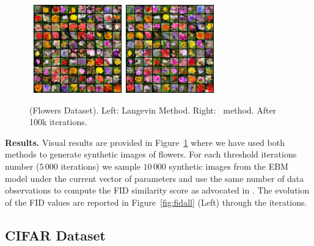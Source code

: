 \documentclass[10pt,twocolumn,letterpaper]{article}
\begin{document}
\begin{figure}[t]
\begin{center}
        \mbox{
        \includegraphics[width=1.5in]{figs/flowerslangevin}
        \includegraphics[width=1.5in]{figs/flowersanila}
        }
\end{center}
	\caption{(Flowers Dataset). Left: Langevin Method. Right: \algo\ method. After 100k iterations.}
	\label{fig:flowers}
\end{figure}

\medskip
\textbf{Results.} 
Visual results are provided in Figure~\ref{fig:flowers} where we have used both methods to generate synthetic images of flowers.
For each threshold iterations number ($5\,000$ iterations) we sample $10\,000$ synthetic images from the EBM model under the current vector of parameters and use the same number of data observations to compute the FID similarity score as advocated in \cite{heusel2017gans}.
The evolution of the FID values are reported in Figure~\ref{fig:fidall} (Left) through the iterations.






\subsection{CIFAR Dataset}
\end{document}
